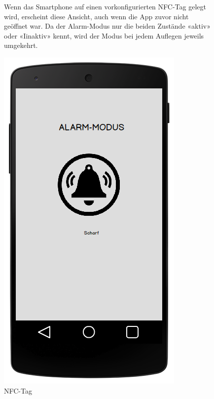 \begin{figure}[H]
	\begin{minipage}{0.6\textwidth} 
Wenn das Smartphone auf einen vorkonfigurierten NFC-Tag gelegt wird, erscheint diese Ansicht, auch wenn die App zuvor nicht geöffnet war. Da der Alarm-Modus nur die beiden Zustände «aktiv» oder «Iinaktiv» kennt, wird der Modus bei jedem Auflegen jeweils umgekehrt.
	\end{minipage}
	\hfill
	\begin{minipage}{0.32\textwidth}
		\includegraphics[width=\textwidth]{report/img/mockup_nfc.png}
		\caption{NFC-Tag}
		\label{fig:mockupNfc}
	\end{minipage}
\end{figure}




